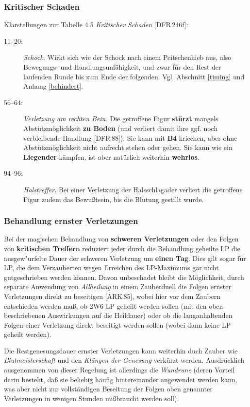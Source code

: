 \documentclass[10pt,a4paper,germanpar]{article}
\begin{document}
\subsubsection{Kritischer Schaden}

Klarstellungen zur Tabelle 4.5 \emph{Kritischer Schaden} [DFR\,246f]:

\begin{description}
\item[11--20:] \emph{Schock.} Wirkt sich wie der Schock nach einem
  Peitschenhieb aus, also Bewegungs- und Handlungsunfähigkeit, und
  zwar für den Rest der laufenden Runde bis zum Ende der
  folgenden. Vgl. Abschnitt \ref{timing} und Anhang \ref{behindert}.
\item[56--64:] \emph{Verletzung am rechten Bein.} Die getroffene Figur
  \textbf{stürzt} mangels Abstützmöglichkeit \textbf{zu Boden} (und
  verliert damit ihre ggf. noch verbleibende Handlung [DFR\,88]). Sie
  kann mit \textbf{B4} kriechen, aber ohne Abstützmöglichkeit nicht
  aufrecht stehen oder gehen. Sie kann wie ein \textbf{Liegender}
  kämpfen, ist aber natürlich weiterhin \textbf{wehrlos}.
\item[94--96:] \emph{Halstreffer.} Bei einer Verletzung der
  Halsschlagader verliert die getroffene Figur zudem das Bewußtsein,
  bis die Blutung gestillt wurde.
\end{description}

\subsubsection{Behandlung ernster Verletzungen}

Bei der magischen Behandlung von \textbf{schweren Verletzungen} oder
den Folgen von \textbf{kritischen Treffern} reduziert jeder durch die
Behandlung geheilte LP die ausgew"urfelte Dauer der schweren
Verletzung um \textbf{einen Tag}. Dies gilt sogar für LP, die dem
Verzauberten wegen Erreichen des LP-Maximums gar nicht gutgeschrieben
werden können. Davon unbeschadet bleibt die Möglichkeit, durch
separate Anwendung von \emph{Allheilung} in einem Zauberduell die
Folgen ernster Verletzungen direkt zu beseitigen [ARK\,85], wobei
hier vor dem Zaubern entschieden werden muß, ob 2W6 LP geheilt werden
sollen (mit den oben beschriebenen Auswirkungen auf die Heildauer)
oder ob die langanhaltenden Folgen einer Verletzung direkt beseitigt
werden sollen (wobei dann keine LP geheilt werden).

Die Restgenesungsdauer ernster Verletzungen kann weiterhin duch Zauber
wie \emph{Blutmeisterschaft} und den \emph{Klän\-gen der Genesung}
verkürzt werden. Ausdrücklich ausgenommen von dieser Regelung ist
allerdings die \emph{Wundrune} (deren Vorteil darin besteht, daß sie
beliebig häufig hintereinander angewendet werden kann, was aber nicht
zur vollständigen Beseitung der Folgen oben genannter Verletzungen in
wenigen Stunden mißbraucht werden soll).
\end{document}
